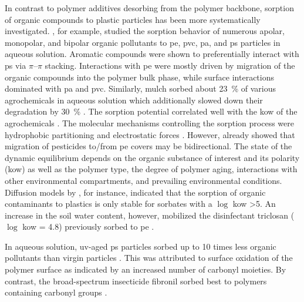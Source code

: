In contrast to polymer additives desorbing from the polymer backbone, sorption of organic compounds to plastic particles has been more systematically investigated. , for example, studied the sorption behavior of numerous apolar, monopolar, and bipolar organic pollutants to \ac{pe}, \ac{pvc}, \ac{pa}, and \ac{ps} particles in aqueous solution. Aromatic compounds were shown to preferentially interact with \ac{ps} via $\pi$--$\pi$ stacking. Interactions with \ac{pe} were mostly driven by migration of the organic compounds into the polymer bulk phase, while surface interactions dominated with \ac{pa} and \ac{pvc}. Similarly,  mulch sorbed about \SI{23}{\percent} of various agrochemicals in aqueous solution which additionally slowed down their degradation by \SI{30}{\percent} \citep{BeriotLaboratory2020}. The sorption potential correlated well with the \ac{kow} of the agrochemicals \citep{BeriotLaboratory2020,WangAdsorption2020,SuntaAdsorption2020,LanComparative2021}. The molecular mechanisms controlling the sorption process were hydrophobic partitioning and electrostatic forces \citep{TourinhoPartitioning2019,LanComparative2021}.
However, \citet{RamosPolyethylene2015} already showed that migration of pesticides to\slash from \ac{pe} covers may be bidirectional. The state of the dynamic equilibrium depends on the organic substance of interest and its polarity (\ac{kow}) as well as the polymer type, the degree of polymer aging, interactions with other environmental compartments, and prevailing environmental conditions. Diffusion models by \citet{CastanMicroplastics2021}, for instance, indicated that the sorption of organic contaminants to plastics is only stable for sorbates with a $\log$ \ac{kow} >5. An increase in the soil water content, however, mobilized the disinfectant triclosan ($\log$ \ac{kow} = 4.8) previously sorbed to \ac{pe} \citep{ChenComparison2021}.

In aqueous solution, \ac{uv}-aged \ac{ps} particles sorbed up to \num{10} times less organic pollutants than virgin particles \citep{HufferData2018,HufferSorption2018}. This was attributed to surface oxidation of the polymer surface as indicated by an increased number of carbonyl moieties. By contrast, the broad-spectrum insecticide fibronil sorbed best to polymers containing carbonyl groups \citep{GongComparative2019}.

